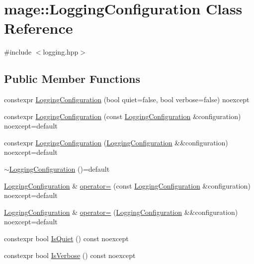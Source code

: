 \hypertarget{classmage_1_1_logging_configuration}{}\section{mage\+:\+:Logging\+Configuration Class Reference}
\label{classmage_1_1_logging_configuration}


{\ttfamily \#include $<$logging.\+hpp$>$}

\subsection*{Public Member Functions}
\begin{DoxyCompactItemize}
\item 
constexpr \mbox{\hyperlink{classmage_1_1_logging_configuration_a506696943c69d6a56ceef5802e0546ba}{Logging\+Configuration}} (bool quiet=false, bool verbose=false) noexcept
\item 
constexpr \mbox{\hyperlink{classmage_1_1_logging_configuration_a4aa9ae2ac1805e062c2b224b1c65ca85}{Logging\+Configuration}} (const \mbox{\hyperlink{classmage_1_1_logging_configuration}{Logging\+Configuration}} \&configuration) noexcept=default
\item 
constexpr \mbox{\hyperlink{classmage_1_1_logging_configuration_a7cd5793f3a568c82fe29c33ee66aeb14}{Logging\+Configuration}} (\mbox{\hyperlink{classmage_1_1_logging_configuration}{Logging\+Configuration}} \&\&configuration) noexcept=default
\item 
\mbox{\hyperlink{classmage_1_1_logging_configuration_a842cd1d5cf22c9fb6e2c76e684cd08ee}{$\sim$\+Logging\+Configuration}} ()=default
\item 
\mbox{\hyperlink{classmage_1_1_logging_configuration}{Logging\+Configuration}} \& \mbox{\hyperlink{classmage_1_1_logging_configuration_a84fe9acca976ad1690a4848235a8a079}{operator=}} (const \mbox{\hyperlink{classmage_1_1_logging_configuration}{Logging\+Configuration}} \&configuration) noexcept=default
\item 
\mbox{\hyperlink{classmage_1_1_logging_configuration}{Logging\+Configuration}} \& \mbox{\hyperlink{classmage_1_1_logging_configuration_abd5b991b7461e52cce5a9787ee3e1955}{operator=}} (\mbox{\hyperlink{classmage_1_1_logging_configuration}{Logging\+Configuration}} \&\&configuration) noexcept=default
\item 
constexpr bool \mbox{\hyperlink{classmage_1_1_logging_configuration_a1096a1ef5f9237fb76fc5937ac1a1210}{Is\+Quiet}} () const noexcept
\item 
constexpr bool \mbox{\hyperlink{classmage_1_1_logging_configuration_abd81834c6938be1b32a7bd6eb08d5242}{Is\+Verbose}} () const noexcept
\end{DoxyCompactItemize}
